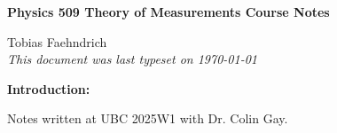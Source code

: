 \documentclass[10pt]{article}
\begin{document}
\begin{tcolorbox}
    \begin{center}
        \begin{Large}
            \textbf{Physics 509 Theory of Measurements Course Notes} \\
            \vspace{5pt}
        \end{Large}
        \begin{large}
            Tobias Faehndrich \\
            \vspace{5pt}
            \emph{This document was last typeset on \today}
        \end{large}
    \end{center}
\end{tcolorbox}

\begin{center}
    \textbf{Introduction:}

    Notes written at UBC 2025W1 with Dr. Colin Gay.

\end{center}
\tableofcontents

\newpage


\newpage


\newpage


\newpage


\newpage


\newpage


\newpage


\newpage


\newpage



\newpage



\newpage



\newpage

\newpage

\end{document}
